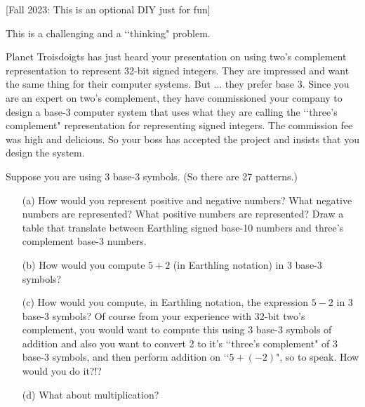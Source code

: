 [Fall 2023: This is an optional DIY just for fun]

This is a challenging and a \lq\lq thinking" problem.

Planet Troisdoigts has just heard your presentation on using
two's complement representation to represent 32-bit signed integers.
They are impressed and want the same thing for their computer
systems.
But ... they prefer base 3.
Since you are an expert on two's complement, they have commissioned
your company to design a base-3 computer system that uses what they
are calling the
\lq\lq three's complement" representation for representing
signed integers.
The commission fee was high and delicious.
So your boss has accepted the project and insists that you design the system.

Suppose you are using 3 base-3 symbols. (So there are 27 patterns.)

\begin{enumerate}
\item[(a)] How would you represent positive and negative numbers?
What negative numbers are represented?
What positive numbers are represented?
Draw a table that translate between Earthling signed base-10 numbers
and three's complement base-3 numbers.

\item[(b)] How would you compute
$5 + 2$ (in Earthling notation) in 3 base-3 symbols?

\item[(c)] How would you compute, in Earthling notation,
the expression $5 - 2$ in 3 base-3 symbols?
Of course from your experience with 32-bit two's complement,
you would want to compute this using 3 base-3 symbols of addition
and also you want to convert 2 to it's \lq\lq three's complement"
of 3 base-3 symbols, and then perform addition on \lq\lq $5 + (-2)$",
so to speak.
How would you do it?!?

\item[(d)]
What about multiplication?

\end{enumerate}
